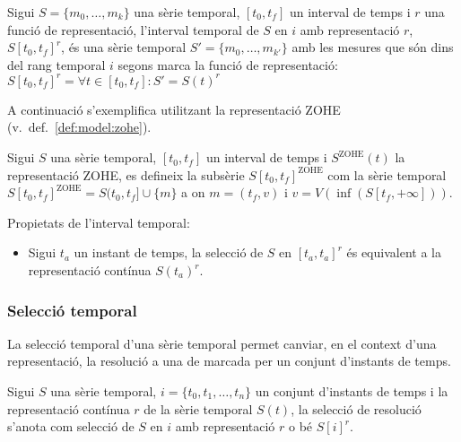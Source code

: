 \begin{definition}
  Sigui $S=\{m_0, \ldots, m_k\}$ una sèrie temporal, $[t_0,t_f]$ un
  interval de temps i $r$ una funció de representació, l'interval
  temporal de $S$ en $i$ amb representació $r$, $S[t_0,t_f]^r$, és una
  sèrie temporal $S'=\{m_0, \ldots, m_{k'}\}$ amb les mesures que són
  dins del rang temporal $i$ segons marca la funció de representació:
  $S[t_0,t_f]^r= \forall t \in [t_0,t_f] : S' = S(t)^r $
\end{definition}


A continuació s'exemplifica utilitzant la representació ZOHE (v.\
def.~\ref{def:model:zohe}).
\begin{definition}
  \label{def:sgst:interval-temporal-zohe}
  Sigui $S$ una sèrie temporal, $[t_0,t_f]$ un interval de temps i
  $S^\text{ZOHE}(t)$ la representació ZOHE, es defineix la subsèrie
  $S[t_0,t_f]^{\text{ZOHE}}$ com la sèrie temporal
  $S[t_0,t_f]^{\text{ZOHE}} = S(t_0,t_f] \cup \{m\}$ a on $m=(t_f,v)$
  i $v= V(\inf( S[t_f,+\infty] ))$.
\end{definition}



Propietats de l'interval temporal:

\begin{itemize}
\item Sigui $t_a$ un instant de temps, la selecció de
  $S$ en $[t_a,t_a]^r$ és equivalent a la representació contínua
  $S(t_a)^r$. 
\end{itemize}




\subsubsection{Selecció temporal}


La selecció  temporal d'una sèrie temporal permet canviar, en el
context d'una representació, la resolució a una de marcada per un
conjunt d'instants de temps. 

Sigui $S$ una sèrie temporal, $i= \{t_0,t_1,\dotsc,t_n\}$ un conjunt
d'instants de temps i la representació contínua $r$ de la sèrie
temporal $S(t)$, la selecció de resolució s'anota com selecció de $S$
en $i$ amb representació $r$ o bé $S[i]^r$.


